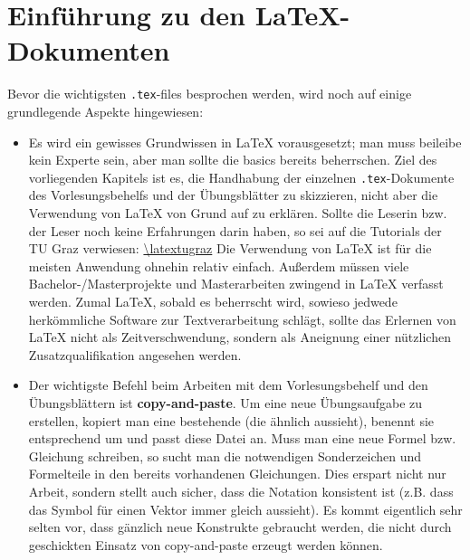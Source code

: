 \chapter{Einf\"{u}hrung zu den \LaTeX-Dokumenten}

Bevor die wichtigsten {\tt .tex}-files besprochen werden, wird noch auf einige
grundlegende Aspekte hingewiesen:

\begin{itemize}
  \item Es wird ein gewisses Grundwissen in \LaTeX{} vorausgesetzt; man muss
    beileibe kein Experte sein, aber man sollte die basics bereits beherrschen.
    Ziel des vorliegenden Kapitels ist es, die Handhabung der 
    einzelnen {\tt .tex}-Dokumente des Vorlesungsbehelfs und der Übungsblätter
    zu skizzieren, nicht aber die Verwendung von \LaTeX{} von Grund auf zu 
    erklären. Sollte die Leserin bzw. der Leser noch keine Erfahrungen darin 
    haben, so sei auf die Tutorials der TU Graz verwiesen:
    \url{\latextugraz}\newline
    Die Verwendung von \LaTeX{} ist für die meisten Anwendung ohnehin relativ
    einfach. Außerdem müssen viele Bachelor-/Masterprojekte und Masterarbeiten
    zwingend in \LaTeX{} verfasst werden. Zumal \LaTeX{}, sobald es beherrscht
    wird, sowieso jedwede herkömmliche Software zur Textverarbeitung schlägt,
    sollte das Erlernen von \LaTeX{} nicht als Zeitverschwendung, sondern als 
    Aneignung einer nützlichen Zusatzqualifikation angesehen werden.
  \item Der wichtigste Befehl beim Arbeiten mit dem Vorlesungsbehelf und
    den Übungsblättern ist {\bf copy-and-paste}. Um eine neue Übungsaufgabe zu
    erstellen, kopiert man eine bestehende (die ähnlich aussieht), benennt sie
    entsprechend um und passt diese Datei an. Muss man eine neue Formel
    bzw. Gleichung schreiben, so sucht man die notwendigen Sonderzeichen und
    Formelteile in den bereits vorhandenen Gleichungen. Dies erspart nicht nur 
    Arbeit, sondern stellt auch sicher, dass die Notation konsistent ist 
    (z.B. dass das Symbol für einen Vektor immer gleich aussieht). 
    Es kommt eigentlich sehr selten vor, dass gänzlich neue Konstrukte 
    gebraucht werden, die nicht durch geschickten Einsatz von copy-and-paste 
    erzeugt werden können.\newline
    \begin{comment}
    Ähnliches gilt beim Arbeiten mit {\tt Corel-Draw}: Muss ein neues Bild
    erstellt werden, so kopiert man sich am besten die Pfeile, Blöcke, Federn
    und sonstige Symbole aus bestehenden Bildern zusammen.
    \end{comment}
\end{itemize}

